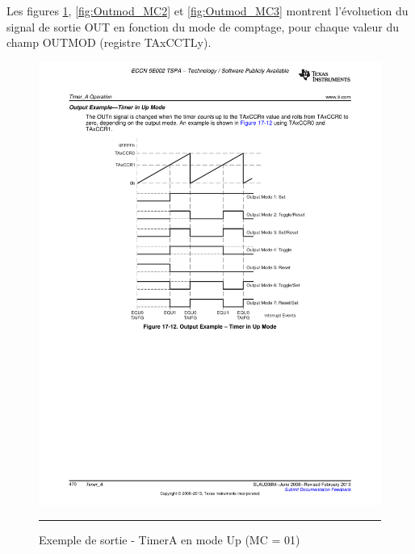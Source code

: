Les figures \ref{fig:Outmod_MC1}, \ref{fig:Outmod_MC2} et \ref{fig:Outmod_MC3} montrent l'évoluetion du signal de sortie OUT en fonction du mode de comptage, pour chaque valeur du champ OUTMOD (registre TAxCCTLy).

\begin{figure}[t]
  \centering
  \includegraphics[angle=0, width=14cm]{./Figures/Chap5_Timer/Timer_Out1.pdf}
  \rule{35em}{0.5pt}
  \caption[Outmod_MC1]{Exemple de sortie - TimerA en mode Up (MC = 01)}
  \label{fig:Outmod_MC1}
\end{figure}

